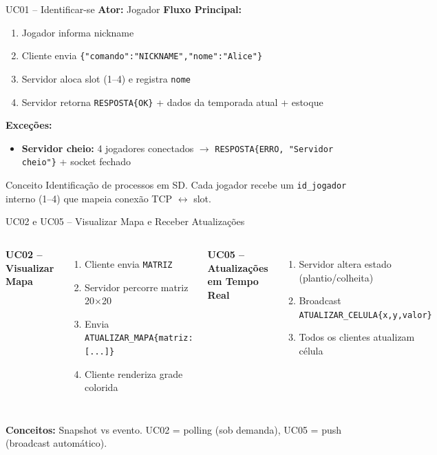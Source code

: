 \documentclass[aspectratio=169]{beamer}
\begin{document}
\begin{frame}{UC01 -- Identificar-se}
  \textbf{Ator:} Jogador
  \vfill
  \textbf{Fluxo Principal:}
  \begin{enumerate}
    \item Jogador informa nickname
    \item Cliente envia \texttt{\{"comando":"NICKNAME","nome":"Alice"\}}
    \item Servidor aloca slot (1--4) e registra \texttt{nome}
    \item Servidor retorna \texttt{RESPOSTA\{OK\}} + dados da temporada atual + estoque
  \end{enumerate}
  \vfill
  \textbf{Exce\c{c}\~oes:}
  \begin{itemize}
    \item \textbf{Servidor cheio:} 4 jogadores conectados $\rightarrow$ \texttt{RESPOSTA\{ERRO, "Servidor cheio"\}} + socket fechado
  \end{itemize}
  \vfill
  \begin{block}{Conceito}
    Identifica\c{c}\~ao de processos em SD. Cada jogador recebe um \texttt{id\_jogador} interno (1--4) que mapeia conex\~ao TCP $\leftrightarrow$ slot.
  \end{block}
\end{frame}

\begin{frame}{UC02 e UC05 -- Visualizar Mapa e Receber Atualiza\c{c}\~oes}
  \begin{columns}
    \textbf{UC02 -- Visualizar Mapa}
    \begin{enumerate}
      \item Cliente envia \texttt{MATRIZ}
      \item Servidor percorre matriz 20$\times$20
      \item Envia \texttt{ATUALIZAR\_MAPA\{matriz:[...]\}}
      \item Cliente renderiza grade colorida
    \end{enumerate}
    \textbf{UC05 -- Atualiza\c{c}\~oes em Tempo Real}
    \begin{enumerate}
      \item Servidor altera estado (plantio/colheita)
      \item Broadcast \texttt{ATUALIZAR\_CELULA\{x,y,valor\}}
      \item Todos os clientes atualizam c\'elula
    \end{enumerate}
  \end{columns}
  \vfill
  \textbf{Conceitos:} Snapshot vs evento. UC02 = polling (sob demanda), UC05 = push (broadcast autom\'atico).
\end{frame}
\end{document}
